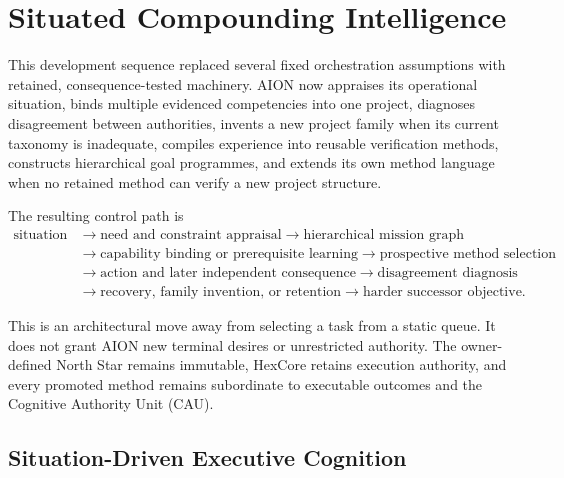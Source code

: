 
\section{Situated Compounding Intelligence}
\label{sec:aion-situated-compounding-open-methods}

This development sequence replaced several fixed orchestration assumptions with
retained, consequence-tested machinery.  AION now appraises its operational
situation, binds multiple evidenced competencies into one project, diagnoses
disagreement between authorities, invents a new project family when its current
taxonomy is inadequate, compiles experience into reusable verification methods,
constructs hierarchical goal programmes, and extends its own method language
when no retained method can verify a new project structure.

The resulting control path is
\begin{equation}
\begin{aligned}
\text{situation}
&\rightarrow \text{need and constraint appraisal}
\rightarrow \text{hierarchical mission graph} \\
&\rightarrow \text{capability binding or prerequisite learning}
\rightarrow \text{prospective method selection} \\
&\rightarrow \text{action and later independent consequence}
\rightarrow \text{disagreement diagnosis} \\
&\rightarrow \text{recovery, family invention, or retention}
\rightarrow \text{harder successor objective}.
\end{aligned}
\label{eq:situated-compounding-loop}
\end{equation}

This is an architectural move away from selecting a task from a static queue.
It does not grant AION new terminal desires or unrestricted authority.  The
owner-defined North Star remains immutable, HexCore retains execution authority,
and every promoted method remains subordinate to executable outcomes and the
Cognitive Authority Unit (CAU).

\subsection{Situation-Driven Executive Cognition}
\label{subsec:situation-driven-executive}


